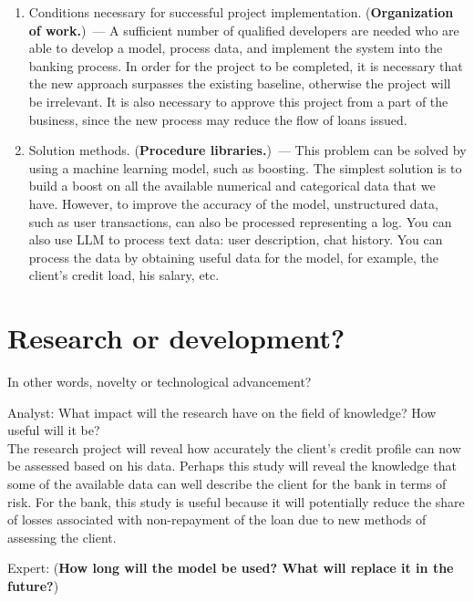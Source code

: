 \documentclass[12pt]{article}
\begin{document}
\begin{enumerate}
\item Conditions necessary for successful project implementation. (\textbf{Organization of work.})~--- A sufficient number of qualified developers are needed who are able to develop a model, process data, and implement the system into the banking process. In order for the project to be completed, it is necessary that the new approach surpasses the existing baseline, otherwise the project will be irrelevant. It is also necessary to approve this project from a part of the business, since the new process may reduce the flow of loans issued. 
\item Solution methods. (\textbf{Procedure libraries.})~--- This problem can be solved by using a machine learning model, such as boosting. The simplest solution is to build a boost on all the available numerical and categorical data that we have. However, to improve the accuracy of the model, unstructured data, such as user transactions, can also be processed representing a log. You can also use LLM to process text data: user description, chat history. You can  process the data by obtaining useful data for the model, for example, the client's credit load, his salary, etc. 
\end{enumerate}

\section{Research or development?}
In other words, novelty or technological advancement?

{Analyst:} What impact will the research have on the field of knowledge? How useful will it be? \\
The research project will reveal how accurately the client's credit profile can now be assessed based on his data. Perhaps this study will reveal the knowledge that some of the available data can well describe the client for the bank in terms of risk. For the bank, this study is useful because it will potentially reduce the share of losses associated with non-repayment of the loan due to new methods of assessing the client. 

{Expert:} (\textbf{How long will the model be used? What will replace it in the future?})

%
%
\end{document}
